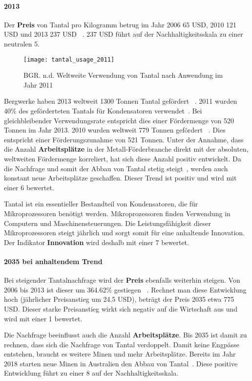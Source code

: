\paragraph{2013}
Der \textbf{Preis} von Tantal pro Kilogramm betrug im Jahr 2006 65 USD, 2010 121 USD und 2013 237 USD ~\cite{tantal_price2}. 237 USD führt auf der Nachhaltigkeitsskala zu einer neutralen 5.

\begin{figure}[h]
\centering
\texttt{[image: tantal\_usage\_2011]}
\caption{BGR. n.d. Weltweite Verwendung von Tantal nach Anwendung im Jahr 2011 ~\cite{tantal_usage}}
\label{}
\end{figure}

Bergwerke haben 2013 weltweit 1300 Tonnen Tantal gefördert ~\cite{tantal_price2}. 2011 wurden 40\% des geförderteten Tantals für Kondensatoren verwendet~\cite{tantal_usage}. Bei gleichbleibender Verwendungsrate entspricht dies einer Fördermenge von 520 Tonnen im Jahr 2013. 2010 wurden weltweit 779 Tonnen gefördert ~\cite{tantal_price2}. Dies entspricht einer Förderungszunahme von 521 Tonnen. Unter der Annahme, dass die Anzahl \textbf{Arbeitsplätze} in der Metall-Förderbranche direkt mit der absoluten, weltweiten Fördermenge korreliert, hat sich diese Anzahl positiv entwickelt. 
Da die Nachfrage und somit der Abbau von Tantal stetig steigt~\cite{tantal_price2}, werden auch konstant neue Arbeitsplätze geschaffen. Dieser Trend ist positiv und wird mit einer 6 bewertet.

Tantal ist ein essentieller Bestandteil von Kondensatoren, die für Mikroprozessoren benötigt werden. Mikroprozessoren finden Verwendung in Computern und Maschinensteuerungen. Die Leistungsfähigkeit dieser Mikroprozessoren steigt jährlich und sorgt somit für eine anhaltende Innovation. Der Indikator \textbf{Innovation} wird deshalb mit einer 7 bewertet.

\paragraph{2035 bei anhaltendem Trend}
Bei steigender Tantalnachfrage wird der \textbf{Preis} ebenfalls weiterhin steigen. Von 2006 bis 2013 ist dieser um 364.62\% gestiegen ~\cite{tantal_price2}. Rechnet man diese Entwicklung hoch (jährlicher Preisanstieg um 24.5 USD), beträgt der Preis 2035 etwa 775 USD. Dieser starke Preisanstieg wirkt sich negativ auf die Wirtschaft aus und wird mit einer 1 bewertet.

Die Nachfrage beeinflusst auch die Anzahl \textbf{Arbeitsplätze}. Bis 2035 ist damit zu rechnen, dass sich die Nachfrage von Tantal verdoppelt. Damit keine Engpässe entstehen, braucht es weitere Minen und mehr Arbeitsplätze. Bereits im Jahr 2018 starten neue Minen in Australien den Abbau von Tantal~\cite{new_mine_aus}. Diese positive Entwicklung führt zu einer 8 auf der Nachhaltigkeitsskala.

